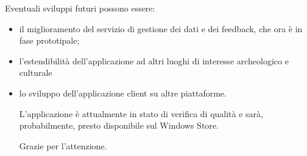\documentclass[12pt]{article}
\begin{document}
Eventuali sviluppi futuri possono essere:
\begin{itemize}
\item il miglioramento del servizio di gestione dei dati e dei feedback, che ora è in fase prototipale; 
\item l'estendibilità dell'applicazione ad altri luoghi di interesse archeologico e culturale
\item lo sviluppo dell'applicazione client su altre piattaforme.


L'applicazione è attualmente in stato di verifica di qualità e sarà, probabilmente, presto disponibile sul Windows Store.

Grazie per l'attenzione.


\end{itemize}
\end{document}
